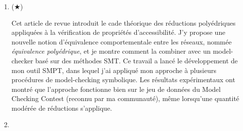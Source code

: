 \begin{enumerate}
  \item ($\bigstar$) \cite{amat_polyhedral_2022}  
  \begin{mdframed}
    Cet article de revue introduit le cade théorique des réductions polyédriques
    appliquées à la vérification de propriétés d'accessibilité. J'y propose une
    nouvelle notion d'équivalence comportementale entre les réseaux, nommée
    \emph{équivalence polyédrique}, et je montre comment la combiner avec un
    model-checker basé sur des méthodes SMT. Ce travail a lancé le développement
    de mon outil \textsf{SMPT}, dans lequel j'ai appliqué mon approche à
    plusieurs procédures de model-checking symbolique. Les résultats
    expérimentaux ont montré que l'approche fonctionne bien sur le jeu de
    données du Model Checking Contest (reconnu par ma communauté), même
    lorsqu'une quantité modérée de réductions s'applique.
  \end{mdframed}
  \smallbreak
	
  \item \cite{amat_leveraging_2022}  
  

\end{enumerate}
